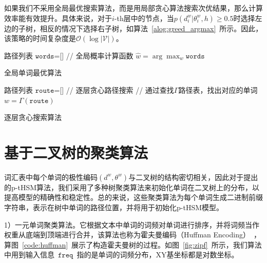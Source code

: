 如果我们不采用全局最优搜索算法，而是用局部贪心算法搜索次优结果，那么计算效率能有效提升。具体来说，对于$i$-th层中的节点，当$ p(d^w_i | \theta_{i}^ w,h)\ge 0.5 $时选择左边的子树，相反的情况下选择右子树，如算法~\ref{alog:greed_argmax}~所示。因此，该策略的时间复杂度是$\mathcal{O}(\log\mathcal{|V|})$。

\begin{algorithm}[!ht]
\SetAlgoLined
{}
 路径列表 $\mathtt{words}$=[] \;
{// 全局概率计算函数}\;
{$\hat w=\arg\max_w{\mathtt{words}}$}\;
\caption{全局单词最优算法}\label{alog:global}
\end{algorithm}

\begin{algorithm}[!ht]
\SetAlgoLined
{}
 路径列表 $\mathtt{route}$=[] \;
 {// 逐层贪心路径搜索}\;
{// 通过查找$\Gamma$路径表，找出对应的单词}\;
$w=\Gamma(\mathtt{route})$\;
\caption{逐层贪心搜索算法\label{alog:greed_argmax}}
\end{algorithm}



\section{基于二叉树的聚类算法}
词汇表中每个单词的极性编码$(d^w,\theta^w)$与二叉树的结构密切相关，因此对于提出的p-tHSM算法，我们采用了多种树聚类算法来初始化单词在二叉树上的分布，以提高模型的精确性和稳定性。总的来说，这些聚类算法为每个单词生成二进制前缀字符串，表示在树中单词的路径位置，并将用于初始化p-tHSM模型。


1）一元单词聚类算法。它根据文本中单词的词频对单词进行排序，并将词频当作权重从底端到顶端进行合并，该算法也称为霍夫曼编码（Huffman Encoding）~，算图~\ref{code:huffman}~展示了构造霍夫曼树的过程。如图~\ref{fig:zipf}~所示，我们算法中用到输入信息~$\texttt{freq}$~指的是单词的词频分布，XY基坐标都是对数坐标。


